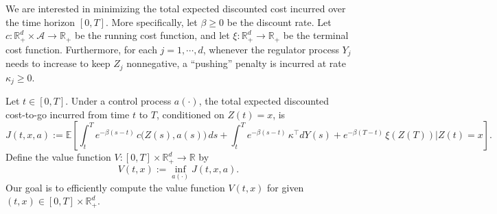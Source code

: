\documentclass[11pt]{article}
\theoremstyle{definition}
\theoremstyle{plain}
\newcommand{\R}{\mathbb{R}}
\begin{document}
We are interested in minimizing the total expected discounted cost incurred over the time horizon $[0, T]$. 
More specifically, let $\beta \geq 0$ be the discount rate. 
Let $c : \mathbb{R}_+^d \times \mathcal{A} \to \mathbb{R}_+$ %
be the running cost function, and let 
$\xi : \mathbb{R}_+^d \to \mathbb{R}_+$ be the terminal cost function. 
Furthermore, for each $j = 1, \cdots, d$, whenever the regulator process $Y_j$ needs to increase to keep $Z_j$ nonnegative, a ``pushing'' penalty is incurred at rate $\kappa_j \geq 0$.

Let $t \in [0, T]$.  
Under a control process $a(\cdot)$, the total expected discounted cost-to-go incurred from time $t$ to $T$, 
conditioned on $Z(t) = x$, is
\begin{equation}\label{eq:J(x,t,theta)}
J(t,x,a) := \mathbb{E} \left[ \int_t^T e^{-\beta (s-t)}\, c\bigl(Z(s), a(s)\bigr)\,ds + \int_t^T e^{-\beta (s - t)}\, \kappa^{\top} dY(s)
+ e^{-\beta (T - t)}\, \xi(Z(T)) \Big| Z(t)=x \right].
\end{equation}
Define the value function \( V : [0,T] \times \mathbb{R}_+^d \to \mathbb{R} \) by
\begin{equation}\label{eq:V}
V(t,x) := \inf_{a(\cdot)} J(t,x,a).
\end{equation}
Our goal is to efficiently compute the value function $V(t,x)$ for given $(t,x) \in [0, T]\times \R_+^d$.
\end{document}

